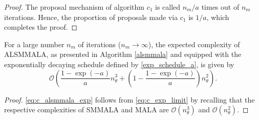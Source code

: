 \documentclass[twoside,11pt]{article}
\begin{document}
\begin{proof}
The proposal mechanism of algorithm $c_1$ is called $n_m/a$ times out of $n_m$ iterations. Hence, the proportion of proposals
made via $c_1$ is $1/a$, which completes the proof.
\end{proof}

\begin{lemma}
For a large number $n_m$ of iterations ($n_m\rightarrow\infty$), the expected complexity of ALSMMALA, as presented in 
Algorithm \ref{alsmmala} and equipped with the exponentially decaying schedule defined by \eqref{exp_schedule_a}, is given by
\begin{equation}
\label{eq:c_alsmmala_exp}
\mathcal{O}\left(
\dfrac{1-\exp{(-a)}}{a}n_{\theta}^3+
\left(1-\dfrac{1-\exp{(-a)}}{a}\right)n_{\theta}^2
\right).
\end{equation}
\end{lemma}

\begin{proof}
\eqref{eq:c_alsmmala_exp} follows from \eqref{eq:c_exp_limit} by recalling that the respective complexities of SMMALA and 
MALA are $\mathcal{O}(n_{\theta}^3)$ and $\mathcal{O}(n_{\theta}^2)$.
\end{proof}
\end{document}
